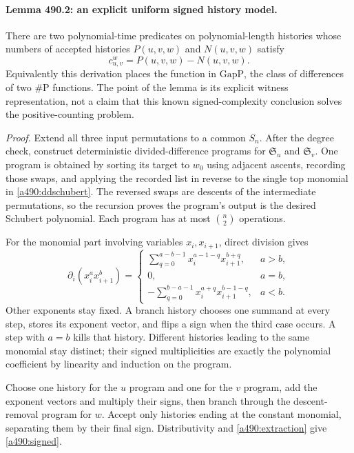 \documentclass[11pt]{article}
\begin{document}
\paragraph{Lemma 490.2: an explicit uniform signed history model.}
There are two polynomial-time predicates on polynomial-length histories
whose numbers of accepted histories $P(u,v,w)$ and $N(u,v,w)$ satisfy
\begin{equation}\label{a490:signed}
                              c_{u,v}^w=P(u,v,w)-N(u,v,w).
\end{equation}
Equivalently this derivation places the function in $\mathrm{GapP}$, the
class of differences of two $\#\mathrm P$ functions. The point of the
lemma is its explicit witness representation, not a claim that this known
signed-complexity conclusion solves the positive-counting problem.

\emph{Proof.} Extend all three input permutations to a common $S_n$.
After the degree check, construct deterministic divided-difference programs
for $\mathfrak S_u$ and $\mathfrak S_v$. One program is obtained by
sorting its target to $w_0$ using adjacent ascents, recording those swaps,
and applying the recorded list in reverse to the single top monomial in
\eqref{a490:ddschubert}. The reversed swaps are descents of the intermediate
permutations, so the recursion proves the program's output is the desired
Schubert polynomial. Each program has at most $\binom n2$ operations.

For the monomial part involving variables $x_i,x_{i+1}$, direct division
gives
\begin{equation}\label{a490:monomialbranch}
 \partial_i(x_i^a x_{i+1}^b)=
 \begin{cases}
 \displaystyle\sum_{q=0}^{a-b-1}x_i^{a-1-q}x_{i+1}^{b+q},&a>b,\\[3pt]
 0,&a=b,\\[3pt]
 \displaystyle-\sum_{q=0}^{b-a-1}x_i^{a+q}x_{i+1}^{b-1-q},&a<b.
 \end{cases}
\end{equation}
Other exponents stay fixed. A branch history chooses one summand at every
step, stores its exponent vector, and flips a sign when the third case
occurs. A step with $a=b$ kills that history. Different histories leading
to the same monomial stay distinct; their signed multiplicities are exactly
the polynomial coefficient by linearity and induction on the program.

Choose one history for the $u$ program and one for the $v$ program, add
the exponent vectors and multiply their signs, then branch through the
descent-removal program for $w$. Accept only histories ending at the
constant monomial, separating them by their final sign. Distributivity
and \eqref{a490:extraction} give \eqref{a490:signed}.
\end{document}
